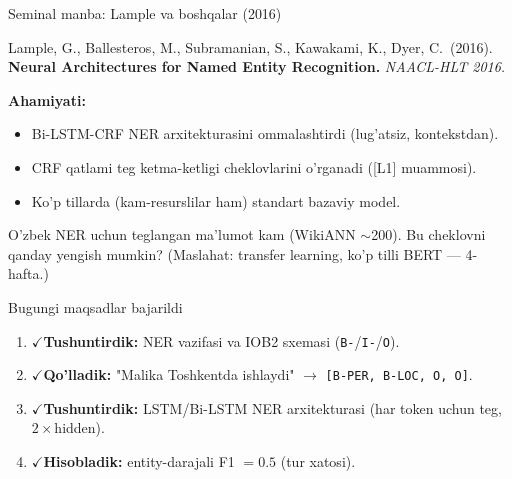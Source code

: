 \documentclass[aspectratio=169,11pt]{beamer}
\newcommand{\bajarildi}{{\color{deepgreen}\large$\checkmark$}\;}
\begin{document}
\begin{frame}{Seminal manba: Lample va boshqalar (2016)}
  \begin{tcolorbox}[defbox,title=Manba]
    \small
    Lample, G., Ballesteros, M., Subramanian, S., Kawakami, K., Dyer, C.\ (2016).
    \textbf{Neural Architectures for Named Entity Recognition.} \textit{NAACL-HLT 2016.}
  \end{tcolorbox}
  \vspace{5pt}
  \textbf{Ahamiyati:}
  \begin{itemize}\small\setlength\itemsep{3pt}
    \item Bi-LSTM-CRF NER arxitekturasini ommalashtirdi (lug'atsiz, kontekstdan).
    \item CRF qatlami teg ketma-ketligi cheklovlarini o'rganadi ([L1] muammosi).
    \item Ko'p tillarda (kam-resurslilar ham) standart bazaviy model.
  \end{itemize}
  \vspace{5pt}
  \begin{tcolorbox}[warnbox,title=Muhokama savoli (P10 gacha o'ylang)]
    \small
    O'zbek NER uchun teglangan ma'lumot kam (WikiANN $\sim$200). Bu cheklovni qanday
    yengish mumkin? (Maslahat: transfer learning, ko'p tilli BERT --- 4-hafta.)
  \end{tcolorbox}
\end{frame}

\begin{frame}{Bugungi maqsadlar bajarildi}
  \begin{enumerate}\setlength\itemsep{7pt}
    \item \bajarildi \textbf{Tushuntirdik:} NER vazifasi va IOB2 sxemasi
          (\texttt{B-}/\texttt{I-}/\texttt{O}).
    \item \bajarildi \textbf{Qo'lladik:} "Malika Toshkentda ishlaydi"
          $\to$ \texttt{[B-PER, B-LOC, O, O]}.
    \item \bajarildi \textbf{Tushuntirdik:} LSTM/Bi-LSTM NER arxitekturasi
          (har token uchun teg, $2\times$hidden).
    \item \bajarildi \textbf{Hisobladik:} entity-darajali F1 $=0.5$ (tur xatosi).
  \end{enumerate}
\end{frame}
\end{document}
